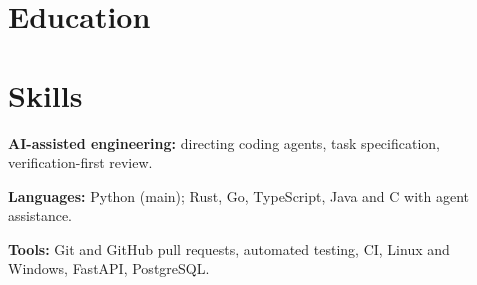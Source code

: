 \section{Education}

\section{Skills}
\begin{bullets}
  \item \textbf{AI-assisted engineering:} directing coding agents, task specification,
        verification-first review.
  \item \textbf{Languages:} Python (main); Rust, Go, TypeScript, Java and C with agent assistance.
  \item \textbf{Tools:} Git and GitHub pull requests, automated testing, CI, Linux and Windows,
        FastAPI, PostgreSQL.
\end{bullets}



